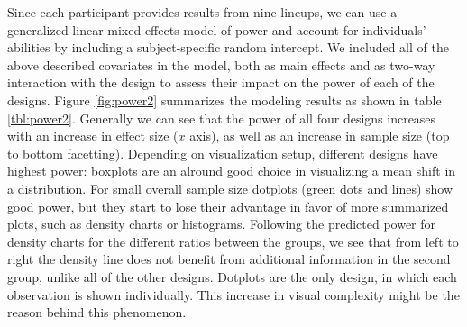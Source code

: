 Since each participant provides results from nine lineups, we can use a generalized linear mixed effects model of power and account for individuals' abilities by including a subject-specific random intercept. We included all of the above described covariates  in the model, both as main effects and as two-way interaction with the design to assess their impact on the power of each of the designs.
Figure \ref{fig:power2} summarizes the modeling results as shown in table \ref{tbl:power2}. Generally we can see that the power of all four designs increases with an increase in effect size ($x$ axis), as well as an increase in sample size (top to bottom facetting). Depending on visualization setup, different designs have highest power: boxplots  are an alround good choice in visualizing a mean shift in a distribution. For small overall sample size dotplots (green dots and lines) show good power, but they  start to lose their advantage in favor of more summarized plots, such as density charts or histograms. Following the predicted power for density charts for the different ratios between the groups, we see that from left to right the density line does not benefit from additional information in the second group, unlike all of the other designs. Dotplots are the only design, in which each observation is shown individually. This increase in visual complexity might be the reason behind this phenomenon.

